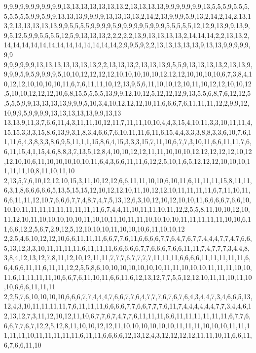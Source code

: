 9,9,9,9,9,9,9,9,9,9,9,13,13,13,13,13,13,13,2,13,13,13,13,9,9,9,9,9,9,9,13,5,5,5,9,5,5,5,5,5,5,5,5,9,9,5,9,9,13,13,13,9,9,9,9,13,13,13,13,2,14,2,13,9,9,9,5,9,13,2,14,2,14,2,13,13,2,13,13,13,13,13,9,9,5,5,5,5,9,9,9,9,5,9,9,9,9,9,5,9,9,9,5,5,5,5,5,12,12,9,13,9,9,13,9,9,5,12,5,9,9,5,5,5,5,12,5,9,13,13,13,2,2,2,2,2,13,9,13,13,13,13,2,14,14,14,2,2,13,13,2,14,14,14,14,14,14,14,14,14,14,14,14,14,2,9,9,5,9,2,2,13,13,13,13,13,9,13,13,9,9,9,9,9,9,9
9,9,9,9,9,9,13,13,13,13,13,13,13,2,2,13,13,13,2,13,13,13,9,5,5,9,13,13,13,13,2,13,13,9,9,9,9,5,9,5,9,9,9,9,5,10,10,12,12,12,12,10,10,10,10,10,12,12,12,10,10,10,10,6,7,3,8,4,10,12,12,10,10,10,10,11,6,7,6,11,11,10,12,13,9,5,6,11,10,10,12,10,11,10,12,12,10,10,12,5,10,10,12,12,12,10,6,8,15,5,5,5,5,13,9,9,12,10,12,5,12,12,12,9,13,5,5,6,8,7,6,12,12,5,5,5,5,9,9,13,13,13,13,9,9,9,5,10,3,4,10,12,12,12,10,11,6,6,6,7,6,11,11,11,12,2,9,9,12,10,9,9,5,9,9,9,9,13,13,13,13,13,9,9,13,13
13,13,9,11,3,7,6,6,11,4,3,11,11,10,12,11,7,11,11,10,10,4,4,3,15,4,10,11,3,3,10,11,11,4,15,15,3,3,3,15,8,6,13,9,3,1,8,3,4,6,6,7,6,10,11,11,6,11,6,15,4,4,3,3,3,8,8,3,3,6,10,7,6,11,11,6,4,3,8,3,3,8,6,9,5,11,1,1,15,8,6,4,15,3,3,3,15,7,11,10,6,7,7,3,10,11,6,6,11,11,7,6,6,11,15,4,1,15,4,6,8,8,3,7,13,5,12,8,4,10,10,12,12,11,11,10,10,10,12,12,12,12,12,10,12,12,10,10,6,11,10,10,10,10,10,11,6,4,3,6,6,11,11,6,12,2,5,10,1,6,5,12,12,12,10,10,10,11,11,11,10,8,11,10,11,10
2,13,5,7,6,10,12,12,10,15,3,11,10,12,12,6,6,11,11,10,10,6,10,11,6,11,11,11,15,8,11,11,6,3,1,8,6,6,6,6,6,5,13,5,15,15,12,10,12,12,10,11,10,12,12,10,11,11,11,11,6,7,11,10,11,6,6,11,11,12,10,7,6,6,6,7,7,4,8,7,4,7,5,13,12,6,3,10,12,10,12,10,10,11,6,6,6,6,7,6,6,10,10,10,11,11,11,11,11,11,11,11,11,6,7,4,4,11,10,11,11,10,11,12,2,5,5,8,11,10,10,12,10,11,12,10,11,10,10,10,10,10,11,10,10,11,10,11,11,10,10,10,10,11,11,11,11,11,10,10,6,11,6,6,12,2,5,6,7,2,9,12,5,12,10,10,10,11,10,10,10,6,11,10,10,12
2,2,5,4,6,10,12,12,10,6,6,11,11,11,6,6,7,7,6,11,6,6,6,6,7,7,6,4,7,6,7,7,4,4,4,7,7,4,7,6,6,5,13,12,3,3,10,11,11,11,11,6,11,11,11,6,6,6,6,6,7,7,6,6,6,7,6,6,11,11,7,4,7,7,7,3,4,4,8,3,8,4,12,13,12,7,8,11,12,10,12,11,11,7,7,7,6,7,7,7,7,11,11,11,6,6,6,6,11,11,11,11,11,6,6,4,6,6,11,11,6,11,11,12,2,5,5,8,6,10,10,10,10,10,10,10,11,11,10,10,10,11,11,11,10,10,11,6,11,11,11,11,10,6,6,7,6,11,10,11,6,6,11,6,12,13,12,7,7,5,5,12,12,10,11,11,10,11,10,10,6,6,6,11,11,11
2,2,5,7,6,10,10,10,10,6,6,6,7,7,4,4,4,7,6,6,7,7,6,4,7,7,7,6,7,6,7,6,4,3,4,4,7,3,4,6,6,5,13,12,4,3,10,11,11,11,11,7,6,11,11,11,6,6,6,6,7,7,6,6,7,7,7,6,11,7,4,4,4,4,4,4,7,7,3,4,4,6,12,13,12,7,3,11,12,10,12,11,10,6,7,7,6,7,4,7,7,6,11,11,11,6,6,11,11,11,11,11,11,6,7,7,6,6,6,7,7,6,7,12,2,5,12,8,11,10,10,12,12,11,10,10,10,10,10,10,11,11,11,10,10,10,11,11,11,11,11,10,11,11,11,11,11,6,11,11,6,6,6,6,12,13,12,4,3,12,12,12,12,11,11,10,11,6,6,11,6,7,6,6,11,10
